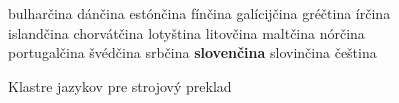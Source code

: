 \begin{multicols}{2}
\begin{figure}[h!]
\begin{tabular}
bulharčina \newline 
dánčina \newline 
estónčina \newline 
fínčina \newline 
galícijčina \newline 
gréčtina \newline 
írčina \newline 
islandčina \newline 
chorvátčina \newline 
lotyština \newline 
litovčina \newline 
maltčina \newline 
nórčina \newline 
portugalčina \newline 
švédčina \newline 
srbčina \newline 
\textbf{slovenčina} \newline 
slovinčina \newline 
čeština \newline
\end{tabular}
\label{fig:mt_cluster_sk}
\caption{Klastre jazykov pre strojový preklad}
\end{figure}


\end{multicols}
